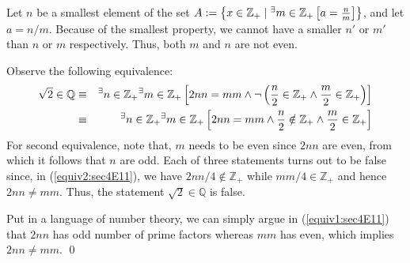 \documentclass[a4paper,12pt]{article}
\begin{document}
\begin{sol}
	Let \( n \) be a smallest element of the set
	\(	A:=\left\{ x\in \mathbb{Z}_{+} \;|\;
	{}^{\exists} m\in \mathbb{Z}_{+}
	\left[ a=\frac{n}{m} \right]
	\right\} \),
	and let
	\( a=n/m \).
	Because of the smallest property,
	we cannot have a smaller
	\( n' \)
	or
	\( m' \)
	than
	\( n \)
	or
	\( m \)
	respectively.
	Thus,
	both
	\( m \)
	and
	\( n \)
	are not even.
	
	Observe the following equivalence:
	\begin{eqnarray}
		\sqrt{2}\in \mathbb{Q}
		&\equiv&
		{}^{\exists} n\in \mathbb{Z}_{+}
		{}^{\exists} m \in \mathbb{Z}_{+}
		\left[
			2nn=mm 
			\wedge
			\neg
			\left(
			\frac{n}{2} \in \mathbb{Z}_{+}
			\wedge
			\frac{m}{2} \in \mathbb{Z}_{+}
			\right)
			\right] \label{equiv1:sec4E11}\\
		&\equiv&
		{}^{\exists} n\in \mathbb{Z}_{+}
		{}^{\exists} m \in \mathbb{Z}_{+}
		\left[
			2nn=mm 
			\wedge
			\frac{n}{2} \notin \mathbb{Z}_{+}
			\wedge
			\frac{m}{2} \in \mathbb{Z}_{+}
			\right]\label{equiv2:sec4E11}
	\end{eqnarray}
	For second equivalence, note that,
	\( m \)
	needs to be even since
	\( 2nn \)
	are even, from which it follows that
	\( n \)
	are odd.
	Each of three statements turns out to be false since, in (\ref{equiv2:sec4E11}),
	we have
	\( 2nn/4 \notin \mathbb{Z}_{+} \)
	while
	\( mm/4 \in \mathbb{Z}_{+} \)
	and hence
	\( 2nn \neq mm \).
	Thus, the statement \( \sqrt{2}\in \mathbb{Q}\) is false.
	
	Put in a language of number theory,
	we can simply argue in (\ref{equiv1:sec4E11}) that
	\( 2nn \)
	has odd number of prime factors
	whereas
	\( mm \)
	has even,
	which implies \( 2nn\neq mm \).
	\qed\end{sol}
\end{document}
